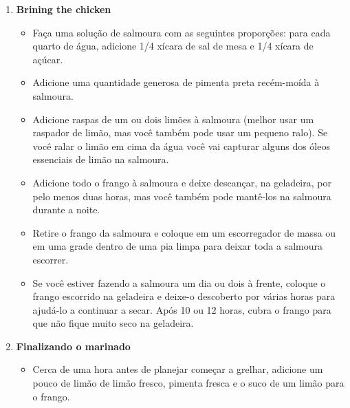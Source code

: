 \documentclass [11pt, letterpaper] {article}
\begin{document}
\begin {description}
\begin {enumerate}
\item {\bf Brining the chicken}
\begin {itemize}
\item Faça uma solução de salmoura com as seguintes proporções: para cada quarto de água, adicione 1/4 xícara de sal de mesa e 1/4 xícara de açúcar.
\item Adicione uma quantidade generosa de pimenta preta recém-mo\'ida à salmoura.
\item Adicione raspas de um ou dois limões à salmoura (melhor usar um raspador de limão, mas você também pode usar um pequeno ralo). Se você ralar o lim\~ao em cima da água você vai capturar alguns dos óleos essenciais de limão na salmoura.
\item Adicione todo o frango à salmoura e deixe descan\c{c}ar, na geladeira, por pelo menos duas horas, mas você também pode mantê-los na salmoura durante a noite.
\item Retire o frango da salmoura e coloque em um escorregador de massa ou em uma grade dentro de uma pia limpa para deixar toda a salmoura escorrer.
\item Se você estiver fazendo a salmoura um dia ou dois à frente, coloque o frango escorrido na geladeira e deixe-o descoberto por várias horas para ajudá-lo a continuar a secar. Após 10 ou 12 horas, cubra o frango para que não fique muito seco na geladeira.
\end {itemize}
\item {\bf Finalizando o marinado}
\begin {itemize}
\item Cerca de uma hora antes de planejar começar a grelhar, adicione um pouco de limão de limão fresco, pimenta fresca e o suco de um limão para o frango.
\end {itemize}


\end{enumerate}
\end{description}
\end{document}
